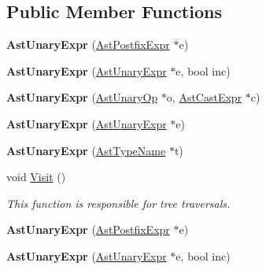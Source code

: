 \subsection*{Public Member Functions}
\begin{DoxyCompactItemize}
\item 
\hypertarget{classAstUnaryExpr_a7afc6e7c4cf309676aa701656c70453a}{{\bfseries Ast\-Unary\-Expr} (\hyperlink{classAstPostfixExpr}{Ast\-Postfix\-Expr} $\ast$e)}\label{classAstUnaryExpr_a7afc6e7c4cf309676aa701656c70453a}

\item 
\hypertarget{classAstUnaryExpr_a82859566c71d787e29263ff3ba013261}{{\bfseries Ast\-Unary\-Expr} (\hyperlink{classAstUnaryExpr}{Ast\-Unary\-Expr} $\ast$e, bool inc)}\label{classAstUnaryExpr_a82859566c71d787e29263ff3ba013261}

\item 
\hypertarget{classAstUnaryExpr_ad71de2cd2c65b31e5f5f5fde4e75fc14}{{\bfseries Ast\-Unary\-Expr} (\hyperlink{classAstUnaryOp}{Ast\-Unary\-Op} $\ast$o, \hyperlink{classAstCastExpr}{Ast\-Cast\-Expr} $\ast$c)}\label{classAstUnaryExpr_ad71de2cd2c65b31e5f5f5fde4e75fc14}

\item 
\hypertarget{classAstUnaryExpr_a22b7c004d42c54c96b40de10cc90a07e}{{\bfseries Ast\-Unary\-Expr} (\hyperlink{classAstUnaryExpr}{Ast\-Unary\-Expr} $\ast$e)}\label{classAstUnaryExpr_a22b7c004d42c54c96b40de10cc90a07e}

\item 
\hypertarget{classAstUnaryExpr_a305b745cf1449c3d3dc4e74dcd768ef1}{{\bfseries Ast\-Unary\-Expr} (\hyperlink{classAstTypeName}{Ast\-Type\-Name} $\ast$t)}\label{classAstUnaryExpr_a305b745cf1449c3d3dc4e74dcd768ef1}

\item 
void \hyperlink{classAstUnaryExpr_ae35427088d6f5c889e8e80573a3750fc}{Visit} ()
\begin{DoxyCompactList}\small\item\em This function is responsible for tree traversals. \end{DoxyCompactList}\item 
\hypertarget{classAstUnaryExpr_a7afc6e7c4cf309676aa701656c70453a}{{\bfseries Ast\-Unary\-Expr} (\hyperlink{classAstPostfixExpr}{Ast\-Postfix\-Expr} $\ast$e)}\label{classAstUnaryExpr_a7afc6e7c4cf309676aa701656c70453a}

\item 
\hypertarget{classAstUnaryExpr_a82859566c71d787e29263ff3ba013261}{{\bfseries Ast\-Unary\-Expr} (\hyperlink{classAstUnaryExpr}{Ast\-Unary\-Expr} $\ast$e, bool inc)}\label{classAstUnaryExpr_a82859566c71d787e29263ff3ba013261}


\end{DoxyCompactItemize}
